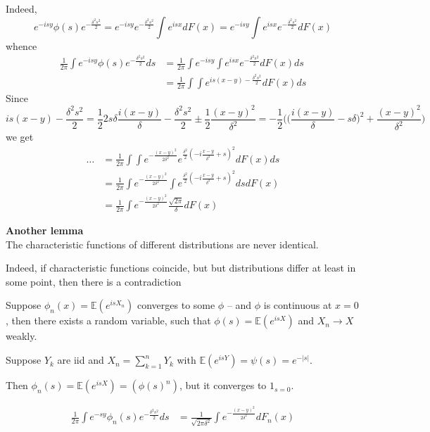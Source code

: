 \documentclass[a4paper]{article}
\newcommand{\brac}[1]{{\left ( #1 \right )}}
\newcommand{\abs}[1]{{\left | #1 \right |}}
\newcommand{\ex}{\mathbb{E}}
\begin{document}
Indeed,
\[e^{-isy}\phi(s)e^{-\frac{\delta^2 s^2}{2}}
= e^{-isy} e^{-\frac{\delta^2 s^2}{2}}\int e^{isx} dF(x)
 = e^{-isy}\int e^{isx} e^{-\frac{\delta^2 s^2}{2}} dF(x)\]
whence
\begin{align*}
	\frac{1}{2\pi} \int e^{-isy}\phi(s)e^{-\frac{\delta^2 s^2}{2}} ds
	&= \frac{1}{2\pi} \int e^{-isy} \int e^{isx} e^{-\frac{\delta^2 s^2}{2}} dF(x) ds\\
	&= \frac{1}{2\pi} \int \int e^{is(x-y)-\frac{\delta^2 s^2}{2}} dF(x) ds
\end{align*}
Since
\[is(x-y)-\frac{\delta^2 s^2}{2}
= \frac{1}{2}2s\delta \frac{i(x-y)}{\delta}-\frac{\delta^2 s^2}{2} \pm \frac{1}{2}\frac{(x-y)^2}{\delta^2}
= -\frac{1}{2}\Big( \big( \frac{i(x-y)}{\delta} - s\delta \big)^2 + \frac{(x-y)^2}{\delta^2} \Big)
\]
we get
\begin{align*}
	\ldots
	&= \frac{1}{2\pi} \int \int e^{-\frac{{(x-y)}^2}{2\delta^2}} e^{\frac{\delta^2}{2}\brac{-i\frac{x-y}{\delta^2}+s}^2} dF(x) ds\\
	&= \frac{1}{2\pi} \int e^{-\frac{{(x-y)}^2}{2\delta^2}} \int e^{\frac{\delta^2}{2}\brac{-i\frac{x-y}{\delta^2}+s}^2} ds dF(x)\\
	&= \frac{1}{2\pi} \int e^{-\frac{{(x-y)}^2}{2\delta^2}} \frac{\sqrt{2\pi}}{\delta} dF(x)
\end{align*}

\noindent\textbf{Another lemma}\hfill\\
\noindent The characteristic functions of different distributions are never identical.

Indeed, if characteristic functions coincide, but but distributions differ at least in some point, then there is a contradiction

Suppose $\phi_n(x) = \ex\brac{e^{isX_n}}$ converges to some $\phi$ -- and $\phi$ is continuous at $x=0$, then there exists a random variable, such that $\phi(s) = \ex\brac{e^{isX}}$ and $X_n\to X$ weakly.

Suppose $Y_k$ are iid and $X_n = \sum_{k=1}^n Y_k$ with $\ex\brac{e^{isY}} = \psi(s) = e^{-\abs{s}}$.

Then $\phi_n(s) = \ex\brac{e^{isX}} = \brac{\phi(s)^n}$, but it converges to $1_{s=0}$.


\begin{align*}
	\frac{1}{2\pi}\int e^{-sy} \phi_n(s) e^{-\frac{\delta^2 s^2}{2}}ds
	& = \frac{1}{\sqrt{2\pi\delta^2}}\int e^{-\frac{{(x-y)}^2}{2\delta^2}}dF_n(x)
\end{align*}
\end{document}
